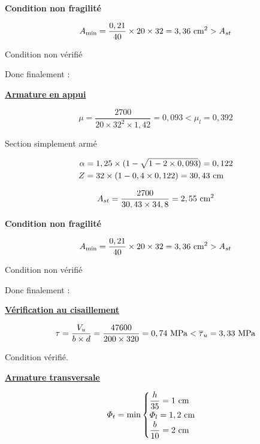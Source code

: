 \textbf{Condition non fragilité}

\[ A_{\min} = \dfrac{0,21}{40} \times 20 \times 32 = 3,36\cmsq > A_{st} \]
{\centering Condition non vérifié\par}

\vspace{\baselineskip}

Donc finalement : 

\vspace{5\baselineskip}

\textbf{\underline{Armature en appui}}

\[ \mu = \dfrac{2700}{20 \times 32^{2} \times 1,42} = 0,093 < \mu_{l} = 0,392 \]
{\centering Section simplement armé\par}

\[ \begin{aligned}
	\alpha &= 1,25 \times (1 - \sqrt{1 - 2 \times 0,093}) = 0,122 \\
	Z &= 32 \times (1 - 0,4 \times 0,122) = 30,43\cml
\end{aligned} \]

\[ A_{st} = \dfrac{2700}{30,43 \times 34,8} = 2,55\cmsq \]

\textbf{Condition non fragilité}

\[ A_{\min} = \dfrac{0,21}{40} \times 20 \times 32 = 3,36\cmsq > A_{st} \]
{\centering Condition non vérifié\par}

\vspace{\baselineskip}

Donc finalement : 

\vspace{3\baselineskip}

\textbf{\underline{Vérification au cisaillement}}

\[ \tau = \dfrac{V_{u}}{b \times d} = \dfrac{47600}{200 \times 320} = 0,74\mpa < \taubar{u} = 3,33\mpa \]
{\centering Condition vérifié.\par}


\vspace{6\baselineskip}


\textbf{\underline{Armature transversale}}

\[ \varPhi_{t} = \min \begin{cases}
	\dfrac{h}{35} = 1\cml\\
	\varPhi_{l} = 1,2\cml \\
	\dfrac{b}{10} = 2\cml
\end{cases} \]

